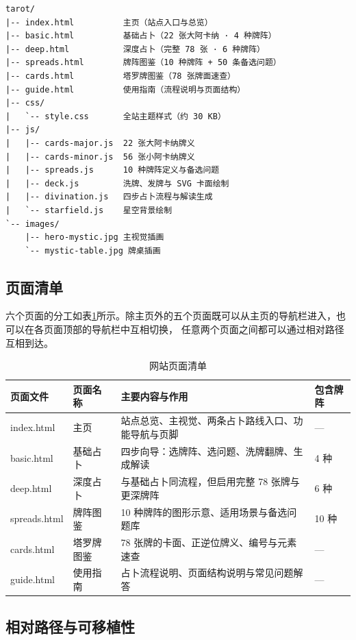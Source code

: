 \documentclass[supercite]{Experimental_Report}
\begin{document}
\begin{verbatim}
tarot/
|-- index.html          主页（站点入口与总览）
|-- basic.html          基础占卜（22 张大阿卡纳 · 4 种牌阵）
|-- deep.html           深度占卜（完整 78 张 · 6 种牌阵）
|-- spreads.html        牌阵图鉴（10 种牌阵 + 50 条备选问题）
|-- cards.html          塔罗牌图鉴（78 张牌面速查）
|-- guide.html          使用指南（流程说明与页面结构）
|-- css/
|   `-- style.css       全站主题样式（约 30 KB）
|-- js/
|   |-- cards-major.js  22 张大阿卡纳牌义
|   |-- cards-minor.js  56 张小阿卡纳牌义
|   |-- spreads.js      10 种牌阵定义与备选问题
|   |-- deck.js         洗牌、发牌与 SVG 卡面绘制
|   |-- divination.js   四步占卜流程与解读生成
|   `-- starfield.js    星空背景绘制
`-- images/
    |-- hero-mystic.jpg 主视觉插画
    `-- mystic-table.jpg 牌桌插画
\end{verbatim}

\subsection{页面清单}

六个页面的分工如表\ref{tab:pages}所示。除主页外的五个页面既可以从主页的导航栏进入，也可以在各页面顶部的导航栏中互相切换，
任意两个页面之间都可以通过相对路径互相到达。

\begin{table}[htb]
	\centering
	\caption{网站页面清单}
	\label{tab:pages}
	\begin{tabularx}{\textwidth}{l l X l}
		\toprule
		页面文件 & 页面名称 & 主要内容与作用 & 包含牌阵 \\
		\midrule
		index.html & 主页 & 站点总览、主视觉、两条占卜路线入口、功能导航与页脚 & --- \\
		basic.html & 基础占卜 & 四步向导：选牌阵、选问题、洗牌翻牌、生成解读 & 4 种 \\
		deep.html & 深度占卜 & 与基础占卜同流程，但启用完整 78 张牌与更深牌阵 & 6 种 \\
		spreads.html & 牌阵图鉴 & 10 种牌阵的图形示意、适用场景与备选问题库 & 10 种 \\
		cards.html & 塔罗牌图鉴 & 78 张牌的卡面、正逆位牌义、编号与元素速查 & --- \\
		guide.html & 使用指南 & 占卜流程说明、页面结构说明与常见问题解答 & --- \\
		\bottomrule
	\end{tabularx}
\end{table}

\subsection{相对路径与可移植性}
\end{document}
